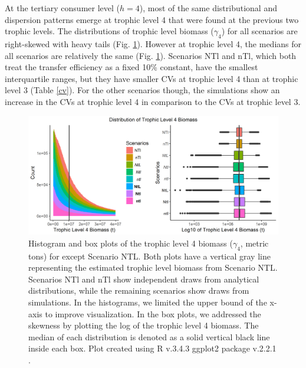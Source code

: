 \documentclass[oneside,12pt,final]{sty/ucthesis-CA2012}
\let\cite\citep                             %
\begin{document}
\begin{mainmatter}
At the tertiary consumer level ($h=4$), most of the same distributional and dispersion patterns emerge at trophic level 4 that were found at the previous two trophic levels. The distributions of trophic level biomass ($\gamma_4$) for all scenarios are right-skewed with heavy tails (Fig. \ref{beta4estimated}). However at trophic level 4, the medians for all scenarios are relatively the same (Fig. \ref{beta4estimated}). Scenarios NTl and nTl, which both treat the transfer efficiency as a fixed 10\% constant, have the smallest interquartile ranges, but they have smaller CVs at trophic level 4 than at trophic level 3 (Table \ref{cv}). For the other scenarios though, the simulations show an increase in the CVs at trophic level 4 in comparison to the CVs at trophic level 3. 

\begin{figure}[H]
     \centering
       \includegraphics[width=\textwidth]{fig/biomass4_hist_box_v3.png}
    \caption{Histogram and box plots of the trophic level 4 biomass ($\gamma_4$, metric tons) for except Scenario NTL. Both plots have a vertical gray line representing the estimated trophic level biomass from Scenario NTL. Scenarios NTl and nTl show independent draws from analytical distributions, while the remaining scenarios show draws from simulations. In the histograms, we limited the upper bound of the x-axis to improve visualization. In the box plots, we addressed the skewness by plotting the log of the trophic level 4 biomass. The median of each distribution is denoted as a solid vertical black line inside each box. Plot created using R v.3.4.3 \cite{Rcite} ggplot2 package v.2.2.1 \cite{ggplot}. }
    \label{beta4estimated}
\end{figure}



\end{mainmatter}
\end{document}
